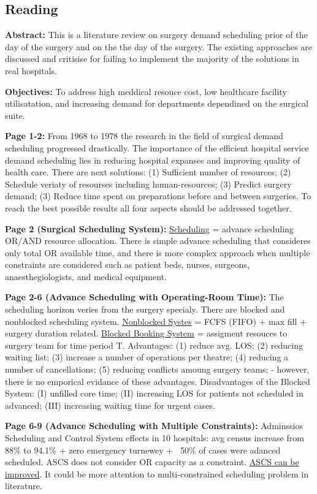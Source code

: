 \subsection{Reading}
    \textbf{Abstract:}
    This is a literature review on surgery demand scheduling prior of the day of the surgery and on the the day of the surgery. The existing approaches are discussed and critisise for failing to implement the majority of the solutions in real hospitals.
    
    \textbf{Objectives:}
    To address high meddical resouce cost, low healthcare facility utilisatation, and increasing demand for departments dependined on the surgical suite. 

    \textbf{Page 1-2:}
    From 1968 to 1978 the research in the field of surgical demand scheduling progressed drastically. The importance of the efficient hospital service demand scheduling lies in reducing hospital expanses and improving quality of health care. There are next solutions: (1) Sufficient number of resources; (2) Schedule veriaty of resourses including human-resources; (3) Predict surgery demand; (3) Reduce time spent on preparations before and between surgeries. To reach the best possible results all four aspects should be addressed together. 
    
    \textbf{Page 2 (Surgical Scheduling System):}
    \underline{Scheduling} = advance scheduling OR/AND resource allocation. There is simple advance scheduling that consideres only total OR available time, and there is more complex approach when multiple constraints are considered such as patient beds, nurses, surgeons, anaesthegiologists, and medical equipment.

    \textbf{Page 2-6 (Advance Scheduling with Operating-Room Time):}
    The scheduling horizon veries from the surgery specialy. There are blocked and nonblocked scheduling system. \underline{Nonblocked Systes} = FCFS (FIFO) + max fill + surgery duration related. \underline{Blocked Booking System} = assigment resouces to surgery team for time period T. Advantages: (1) reduce avg. LOS; (2) reducing waiting list; (3) increase a number of operations per theatre; (4) reducing a number of cancellations; (5) reducing conflicts amoung surgery teams; - however, there is no emporical evidance of these advantages. Disadvantages of the Blocked System: (I) unfilled core time; (II) increasing LOS for patients not scheduled in advanced; (III) increasing waiting time for urgent cases.

    \textbf{Page 6-9 (Advance Scheduling with Multiple Constraints):}
    Adminssios Scheduling and Control System effects in 10 hospitals: avg census increase from 88\% to 94.1\% + zero emergency turnewey + ~50\% of cases were adanced scheduled. ASCS does not consider OR capacity as a constraint. \underline{ASCS can be improved}. It could be more attention to multi-constrained scheduling problem in literature.
    
